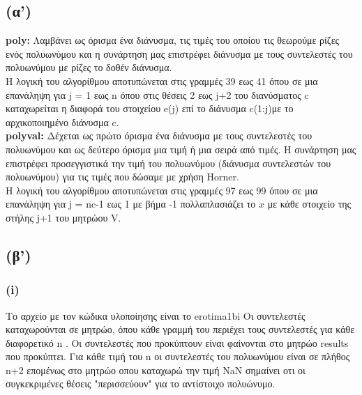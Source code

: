 \documentclass{article}
\begin{document}
\subsection*{(α')}
\textbf{poly:} 
Λαμβάνει ως όρισμα ένα διάνυσμα, τις τιμές του οποίου τις θεωρούμε ρίζες ενός πολυωνύμου και η συνάρτηση μας επιστρέφει διάνυσμα με τους συντελεστές του πολυωνύμου με ρίζες το δοθέν διάνυσμα.\\
Η λογική του αλγορίθμου αποτυπώνεται στις γραμμές 39 εως 41 όπου σε μια επανάληψη για  j = 1 εως n όπου στις θέσεις 2 εως j+2  του διανύσματος c καταχωρείται η διαφορά του στοιχείου e(j) επί το διάνυσμα  c(1:j)με το αρχικοποιημένο διάνυσμα c.\\
\textbf{polyval:}
 Δέχεται ως πρώτο όρισμα ένα διάνυσμα με τους συντελεστές του πολυωνύμου και ως δεύτερο όρισμα μια τιμή ή μια σειρά από τιμές. Η συνάρτηση μας επιστρέφει προσεγγιστικά την τιμή του πολυωνύμου (διάνυσμα συντελεστών του πολυωνύμου) για τις τιμές που δώσαμε με χρήση  Horner.\\
Η λογική του αλγορίθμου αποτυπώνεται στις γραμμές 97 εως 99 όπου σε μια επανάληψη για  j = nc-1 εως 1 με βήμα -1 πολλαπλασιάζει το $x$ με κάθε στοιχείο της στήλης j+1  του μητρώου V.

\subsection*{(β')}
\subsubsection*{(i)}
 Το αρχείο με τον κώδικα υλοποίησης είναι το erotima1bi  Οι συντελεστές καταχωρούνται σε μητρώο, όπου κάθε γραμμή του περιέχει τους συντελεστές για κάθε διαφορετικό  n . Οι συντελεστές που προκύπτουν είναι φαίνονται στο μητρώο  results που προκύπτει. Για κάθε τιμή του  n οι συντελεστές του πολυωνύμου είναι σε πλήθος n+2 επομένως στο μητρώο οπου καταχωρώ την τιμή  NaN σημαίνει οτι οι συγκεκριμένες θέσεις "περισσεύουν" για το αντίστοιχο πολυώνυμο.
\end{document}

